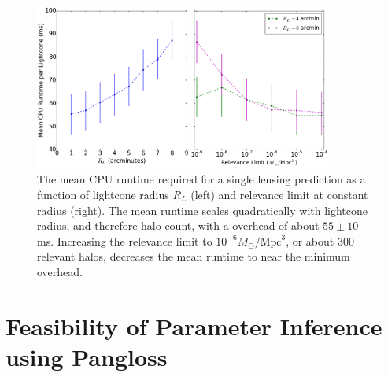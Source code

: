 \documentclass[%
 reprint,
 amsmath,amssymb,
 aps,nofootinbib
]{revtex4-1}
\begin{document}
\begin{figure}
    \centering
    \includegraphics[width=0.875\textwidth]{figs-swe/thesis/cpu_scaling.png}
    \captionsetup{justification=raggedright,singlelinecheck=false}
    \caption{The mean CPU runtime required for a single lensing prediction as a function of lightcone radius $R_L$ (left) and relevance limit at constant radius (right). The mean runtime scales quadratically with lightcone radius, and therefore halo count, with a overhead of about ${55\pm10}$ ms. Increasing the relevance limit to ${10^{-6}M_\odot/\text{Mpc}^3}$, or about 300 relevant halos, decreases the mean runtime to near the minimum overhead.}
    \label{fig:cpu_scaling}
\end{figure}
%

\section{Feasibility of Parameter Inference using Pangloss} \label{feasibility}
\end{document}
